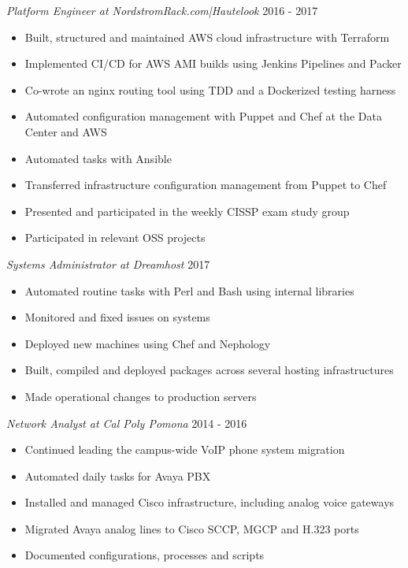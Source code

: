 \documentclass[line]{tex/res}
\begin{document}
\begin{resume}
    {\sl Platform Engineer at NordstromRack.com|Hautelook} \hfill 2016 - 2017
    \begin{itemize} \itemsep -2pt %
        \item Built, structured and maintained AWS cloud infrastructure with Terraform
        \item Implemented CI/CD for AWS AMI builds using Jenkins Pipelines and Packer
        \item Co-wrote an nginx routing tool using TDD and a Dockerized testing harness
        \item Automated configuration management with Puppet and Chef at the Data Center and AWS
        \item Automated tasks with Ansible
        \item Transferred infrastructure configuration management from Puppet to Chef
        \item Presented and participated in the weekly CISSP exam study group
        \item Participated in relevant OSS projects
    \end{itemize}

    {\sl Systems Administrator at Dreamhost} \hfill 2017
    \begin{itemize} \itemsep -2pt
        \item Automated routine tasks with Perl and Bash using internal libraries
        \item Monitored and fixed issues on systems
        \item Deployed new machines using Chef and Nephology
        \item Built, compiled and deployed packages across several hosting infrastructures
        \item Made operational changes to production servers
    \end{itemize}


    {\sl Network Analyst at Cal Poly Pomona} \hfill 2014 - 2016
    \begin{itemize} \itemsep -2pt
        \item Continued leading the campus-wide VoIP phone system migration
        \item Automated daily tasks for Avaya PBX
        \item Installed and managed Cisco infrastructure, including analog voice gateways
        \item Migrated Avaya analog lines to Cisco SCCP, MGCP and H.323 ports
        \item Documented configurations, processes and scripts
    \end{itemize}


\end{resume}
\end{document}

